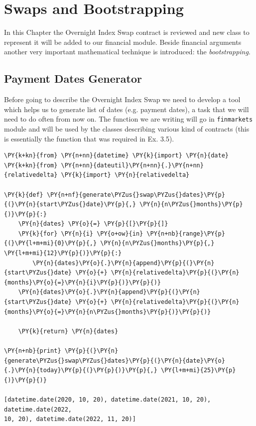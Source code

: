 \chapter{Swaps and Bootstrapping}\label{swaps-and-bootstrapping---practical-lesson-5}

In this Chapter the Overnight Index Swap contract is reviewed and new class to represent it will be added to our financial module. Beside financial arguments another very important mathematical technique is introduced: the \emph{bootstrapping}.

\section{Payment Dates Generator}
Before going to describe the Overnight Index Swap we need to develop a tool which helps us to generate list of dates (e.g. payment dates), a task that we will need to do often from now on. 
The function we are writing will go in \texttt{finmarkets} module and will be used by the classes describing various kind of contracts (this is essentially the function that was required in Ex. 3.5).

\begin{tcolorbox}[size=fbox, boxrule=1pt, colback=cellbackground, colframe=cellborder]
\begin{Verbatim}[commandchars=\\\{\}]
\PY{k+kn}{from} \PY{n+nn}{datetime} \PY{k}{import} \PY{n}{date}
\PY{k+kn}{from} \PY{n+nn}{dateutil}\PY{n+nn}{.}\PY{n+nn}{relativedelta} \PY{k}{import} \PY{n}{relativedelta}

\PY{k}{def} \PY{n+nf}{generate\PYZus{}swap\PYZus{}dates}\PY{p}{(}\PY{n}{start\PYZus{}date}\PY{p}{,} \PY{n}{n\PYZus{}months}\PY{p}{)}\PY{p}{:}
    \PY{n}{dates} \PY{o}{=} \PY{p}{[}\PY{p}{]}
    \PY{k}{for} \PY{n}{i} \PY{o+ow}{in} \PY{n+nb}{range}\PY{p}{(}\PY{l+m+mi}{0}\PY{p}{,} \PY{n}{n\PYZus{}months}\PY{p}{,} \PY{l+m+mi}{12}\PY{p}{)}\PY{p}{:}
        \PY{n}{dates}\PY{o}{.}\PY{n}{append}\PY{p}{(}\PY{n}{start\PYZus{}date} \PY{o}{+} \PY{n}{relativedelta}\PY{p}{(}\PY{n}{months}\PY{o}{=}\PY{n}{i}\PY{p}{)}\PY{p}{)}
    \PY{n}{dates}\PY{o}{.}\PY{n}{append}\PY{p}{(}\PY{n}{start\PYZus{}date} \PY{o}{+} \PY{n}{relativedelta}\PY{p}{(}\PY{n}{months}\PY{o}{=}\PY{n}{n\PYZus{}months}\PY{p}{)}\PY{p}{)}
    
    \PY{k}{return} \PY{n}{dates}

\PY{n+nb}{print} \PY{p}{(}\PY{n}{generate\PYZus{}swap\PYZus{}dates}\PY{p}{(}\PY{n}{date}\PY{o}{.}\PY{n}{today}\PY{p}{(}\PY{p}{)}\PY{p}{,} \PY{l+m+mi}{25}\PY{p}{)}\PY{p}{)}

[datetime.date(2020, 10, 20), datetime.date(2021, 10, 20), datetime.date(2022,
10, 20), datetime.date(2022, 11, 20)]
    \end{Verbatim}
\end{tcolorbox}

